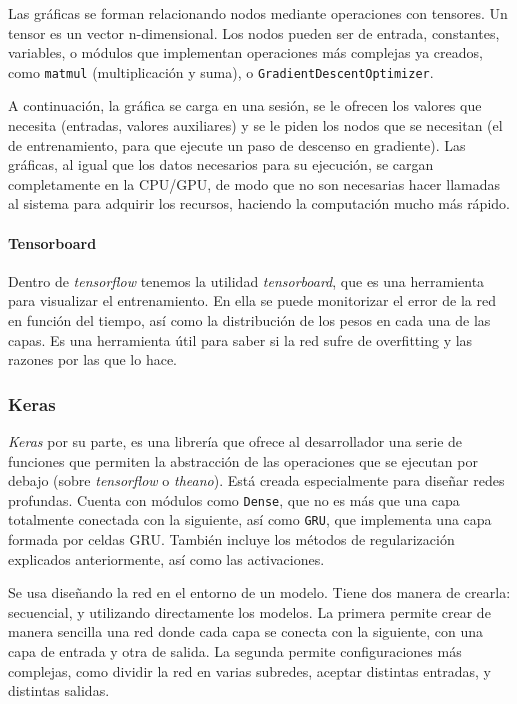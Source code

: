 Las gráficas se forman relacionando nodos mediante operaciones con tensores. Un tensor es un vector n-dimensional. Los nodos pueden ser de entrada, constantes, variables, o módulos que implementan operaciones más complejas ya creados, como \texttt{matmul} (multiplicación y suma), o \texttt{Gradient\-Descent\-Optimizer}.

A continuación, la gráfica se carga en una sesión, se le ofrecen los valores que necesita (entradas, valores auxiliares) y se le piden los nodos que se necesitan (el de entrenamiento, para que ejecute un paso de descenso en gradiente). Las gráficas, al igual que los datos necesarios para su ejecución, se cargan completamente en la CPU/GPU, de modo que no son necesarias hacer llamadas al sistema para adquirir los recursos, haciendo la computación mucho más rápido.
\paragraph{Tensorboard}
Dentro de \textit{tensorflow} tenemos la utilidad \textit{tensorboard}, que es una herramienta para visualizar el entrenamiento. En ella se puede monitorizar el error de la red en función del tiempo, así como la distribución de los pesos en cada una de las capas. Es una herramienta útil para saber si la red sufre de overfitting y las razones por las que lo hace.

\subsubsection{Keras}
\textit{Keras} por su parte, es una librería que ofrece al desarrollador una serie de funciones que permiten la abstracción de las operaciones que se ejecutan por debajo (sobre \textit{tensorflow} o \textit{theano}). Está creada especialmente para diseñar redes profundas. Cuenta con módulos como \texttt{Dense}, que no es más que una capa totalmente conectada con la siguiente, así como \texttt{GRU}, que implementa una capa formada por celdas GRU. También incluye los métodos de regularización explicados anteriormente, así como las activaciones.

Se usa diseñando la red en el entorno de un modelo. Tiene dos manera de crearla: secuencial, y utilizando directamente los modelos. La primera permite crear de manera sencilla una red donde cada capa se conecta con la siguiente, con una capa de entrada y otra de salida. La segunda permite configuraciones más complejas, como dividir la red en varias subredes, aceptar distintas entradas, y distintas salidas.

